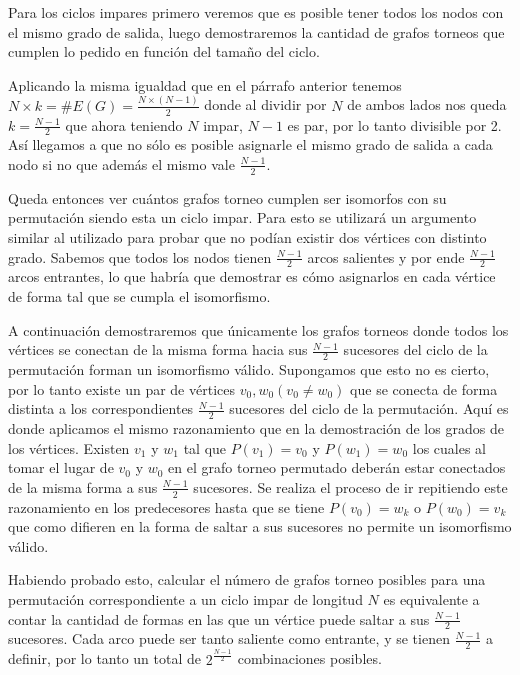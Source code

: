 Para los ciclos impares primero veremos que es posible tener todos los nodos con
el mismo grado de salida, luego demostraremos la cantidad de grafos torneos que
cumplen lo pedido en función del tamaño del ciclo.

Aplicando la misma igualdad que en el párrafo anterior tenemos $N \times k =
\#E(G) = \frac{N \times (N - 1)}{2}$ donde al dividir por $N$ de ambos lados nos
queda $k = \frac{N - 1}{2}$ que ahora teniendo $N$ impar, $N - 1$ es par, por lo
tanto divisible por 2. Así llegamos a que no sólo es posible asignarle el mismo
grado de salida a cada nodo si no que además el mismo vale $\frac{N - 1}{2}$.

Queda entonces ver cuántos grafos torneo cumplen ser isomorfos con su
permutación siendo esta un ciclo impar. Para esto se utilizará un argumento
similar al utilizado para probar que no podían existir dos vértices con distinto
grado. Sabemos que todos los nodos tienen $\frac{N - 1}{2}$ arcos salientes y
por ende $\frac{N - 1}{2}$ arcos entrantes, lo que habría que demostrar es cómo
asignarlos en cada vértice de forma tal que se cumpla el isomorfismo.

A continuación demostraremos que únicamente los grafos torneos donde todos los
vértices se conectan de la misma forma hacia sus $\frac{N - 1}{2}$ sucesores del
ciclo de la permutación forman un isomorfismo válido. Supongamos que esto no es
cierto, por lo tanto existe un par de vértices $v_0, w_0 (v_0 \neq w_0)$ que se
conecta de forma distinta a los correspondientes $\frac{N - 1}{2}$ sucesores del
ciclo de la permutación. Aquí es donde aplicamos el mismo razonamiento que en la
demostración de los grados de los vértices. Existen $v_1$ y $w_1$ tal que
$P(v_1) = v_0$ y $P(w_1) = w_0$ los cuales al tomar el lugar de $v_0$ y $w_0$ en
el grafo torneo permutado deberán estar conectados de la misma forma a sus
$\frac{N - 1}{2}$ sucesores. Se realiza el proceso de ir repitiendo este
razonamiento en los predecesores hasta que se tiene $P(v_0) = w_k$ o $P(w_0) =
v_k$ que como difieren en la forma de saltar a sus sucesores no permite un
isomorfismo válido.

Habiendo probado esto, calcular el número de grafos torneo posibles para una
permutación correspondiente a un ciclo impar de longitud $N$ es equivalente a
contar la cantidad de formas en las que un vértice puede saltar a sus $\frac{N -
1}{2}$ sucesores. Cada arco puede ser tanto saliente como entrante, y se tienen $\frac{N -
1}{2}$ a definir, por lo tanto un total de $2^{\frac{N -1}{2}}$ combinaciones
posibles.

